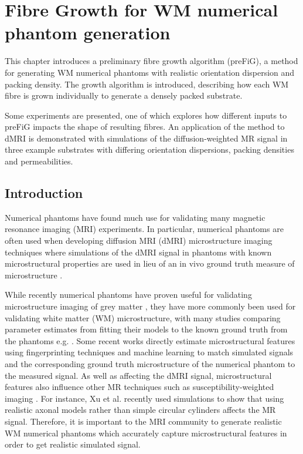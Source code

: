 \chapter{Fibre Growth for WM numerical phantom generation}
\label{chap:ipmi-implementation}

\chaptertoc{}

\begin{chapterabstract}
  This chapter introduces a preliminary fibre growth algorithm (\ac{preFiG}), a method for generating \acf{WM} numerical phantoms with realistic orientation dispersion and packing density.
  The growth algorithm is introduced, describing how each \ac{WM} fibre is grown individually to generate a densely packed substrate.

  Some experiments are presented, one of which explores how different inputs to \ac{preFiG} impacts the shape of resulting fibres.
  An application of the method to dMRI is demonstrated with simulations of the diffusion-weighted MR signal in three example substrates with differing orientation dispersions, packing densities and permeabilities.
\end{chapterabstract}


\section{Introduction}
\label{sec:Introduction}
Numerical phantoms have found much use for validating many magnetic resonance imaging (MRI) experiments.
In particular, numerical phantoms are often used when developing diffusion MRI (dMRI) microstructure imaging techniques where simulations of the dMRI signal in phantoms with known microstructural properties are used in lieu of an in vivo ground truth measure of microstructure \cite{Alexander2017}.

While recently numerical phantoms have proven useful for validating microstructure imaging of grey matter \cite{Palombo2020}, they have more commonly been used for validating white matter (WM) microstructure, with many studies comparing parameter estimates from fitting their models to the known ground truth from the phantoms e.g. \cite{Li2019,Jelescu2017,Scherrer2016,Tariq2016,Daducci2015,Nilsson2017,Xu2014,Zhang2012,Nilsson2010}.
Some recent works directly estimate microstructural features using fingerprinting techniques and machine learning to match simulated signals and the corresponding ground truth microstructure of the numerical phantom to the measured signal\cite{Hill2019,Palombo2018a,Rensonnet2018,Nedjati-Gilani2017}.
As well as affecting the dMRI signal, microstructural features also influence other MR techniques such as susceptibility-weighted imaging \cite{Li2012,Lee2010}.
For instance, Xu et al. \cite{Xu2018} recently used simulations to show that using realistic axonal models rather than simple circular cylinders affects the MR signal.
Therefore, it is important to the MRI community to generate realistic WM numerical phantoms which accurately capture microstructural features in order to get realistic simulated signal.


